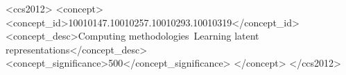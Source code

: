 \documentclass[sigconf]{acmart}
\begin{document}



\newcommand{\benchmarkname}{T-GRAB~}



\begin{CCSXML}
<ccs2012>
<concept>
<concept_id>10010147.10010257.10010293.10010319</concept_id>
<concept_desc>Computing methodologies~Learning latent representations</concept_desc>
<concept_significance>500</concept_significance>
</concept>
</ccs2012>
\end{CCSXML}

\end{document}
